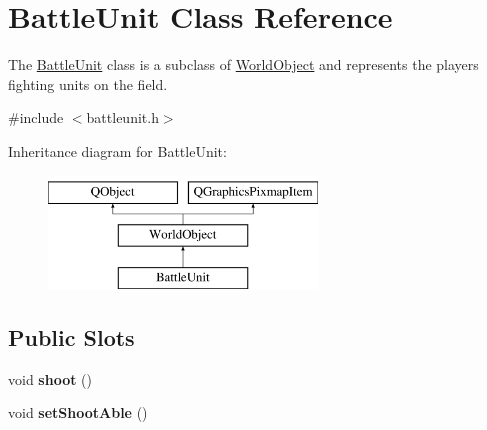 \hypertarget{class_battle_unit}{}\section{Battle\+Unit Class Reference}
\label{class_battle_unit}


The \hyperlink{class_battle_unit}{Battle\+Unit} class is a subclass of \hyperlink{class_world_object}{World\+Object} and represents the player\textquotesingle{}s fighting units on the field.  




{\ttfamily \#include $<$battleunit.\+h$>$}

Inheritance diagram for Battle\+Unit\+:\begin{figure}[H]
\begin{center}
\leavevmode
\includegraphics[height=3.000000cm]{class_battle_unit}
\end{center}
\end{figure}
\subsection*{Public Slots}
\begin{DoxyCompactItemize}
\item 
void {\bfseries shoot} ()\hypertarget{class_battle_unit_ad483aca2f0e52cb79c5b0444f6fbd1da}{}\label{class_battle_unit_ad483aca2f0e52cb79c5b0444f6fbd1da}

\item 
void {\bfseries set\+Shoot\+Able} ()\hypertarget{class_battle_unit_a32aaaf8056f9545f231a9bdc368aef8f}{}\label{class_battle_unit_a32aaaf8056f9545f231a9bdc368aef8f}

\end{DoxyCompactItemize}
